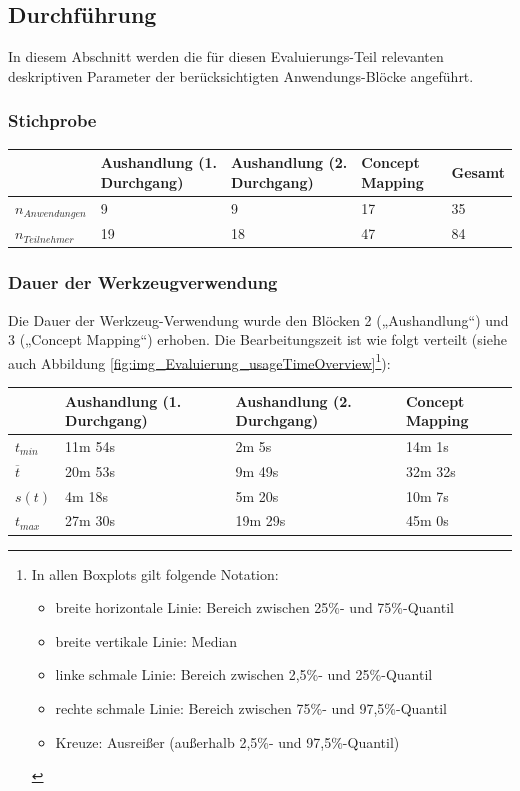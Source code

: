 
\subsection{Durchführung} %
\label{sub:durchführung}

In diesem Abschnitt werden die für diesen Evaluierungs-Teil relevanten deskriptiven Parameter der berücksichtigten Anwendungs-Blöcke angeführt.

\subsubsection{Stichprobe} %

\begin{tabular}{| p{2cm} || p{} | p{} | p{} || p{2cm} |}
  \hline
   & Aushandlung (1. Durchgang) & Aushandlung (2. Durchgang) & Concept Mapping & Gesamt \\ \hline
   $n_{Anwendungen}$ & 9 & 9 & 17 & 35 \\ 
   $n_{Teilnehmer}$ & 19 & 18 & 47 & 84 \\ \hline
\end{tabular} 

\subsubsection{Dauer der Werkzeugverwendung} %

Die Dauer der Werkzeug-Verwendung wurde den Blöcken 2 („Aushandlung“) und 3 („Concept Mapping“) erhoben. Die Bearbeitungszeit ist wie folgt verteilt (siehe auch Abbildung \ref{fig:img_Evaluierung_usageTimeOverview}\footnote{In allen Boxplots gilt folgende Notation: 
\begin{itemize}
	\item breite horizontale Linie: Bereich zwischen 25\%- und 75\%-Quantil
	\item breite vertikale Linie: Median
	\item linke schmale Linie: Bereich zwischen 2,5\%- und 25\%-Quantil
	\item rechte schmale Linie: Bereich zwischen 75\%- und 97,5\%-Quantil
	\item Kreuze: Ausreißer (außerhalb 2,5\%- und 97,5\%-Quantil)
\end{itemize}
}):

\begin{tabular}{| p{1cm} || p{3cm} | p{3cm} | p{3cm} |}
  \hline
   & Aushandlung (1. Durchgang) & Aushandlung (2. Durchgang) & Concept Mapping \\ \hline
   $t_{min}$ & 11m 54s & 2m 5s & 14m 1s \\ 
   $\overline{t}$ & 20m 53s & 9m 49s & 32m 32s \\ 
   $s(t)$ & 4m 18s & 5m 20s & 10m 7s \\
   $t_{max}$ & 27m 30s & 19m 29s & 45m 0s \\ \hline
\end{tabular} 

